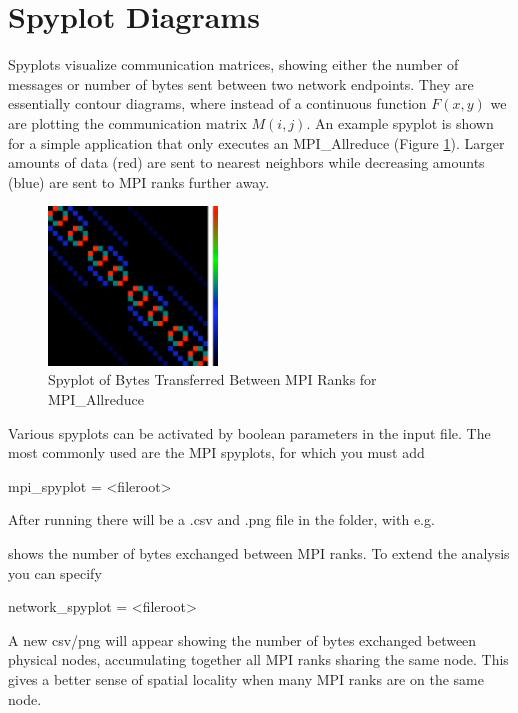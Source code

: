 

\section{Spyplot Diagrams}
\label{sec:tutorials:spyplot}

Spyplots visualize communication matrices, showing either the number of messages or number of bytes sent between two network endpoints.
They are essentially contour diagrams, where instead of a continuous function $F(x,y)$ we are plotting the communication matrix $M(i,j)$.
An example spyplot is shown for a simple application that only executes an MPI\_Allreduce (Figure \ref{fig:spyplot}).
Larger amounts of data (red) are sent to nearest neighbors while decreasing amounts (blue) are sent to MPI ranks further away.

\begin{figure}[h]
\centering
\includegraphics[width=0.4\textwidth]{figures/spyplot/mpi_spyplot.pdf}
\caption{Spyplot of Bytes Transferred Between MPI Ranks for MPI\_Allreduce}
\label{fig:spyplot}
\end{figure}

Various spyplots can be activated by boolean parameters in the input file.
The most commonly used are the MPI spyplots, for which you must add

\begin{ViFile}
mpi_spyplot = <fileroot>
\end{ViFile}

After running there will be a .csv and .png file in the folder, with e.g. 

 shows the number of bytes exchanged between MPI ranks.
To extend the analysis you can specify

\begin{ViFile}
network_spyplot = <fileroot>
\end{ViFile}
A new csv/png will appear showing the number of bytes exchanged between physical nodes, 
accumulating together all MPI ranks sharing the same node.
This gives a better sense of spatial locality when many MPI ranks are on the same node.


